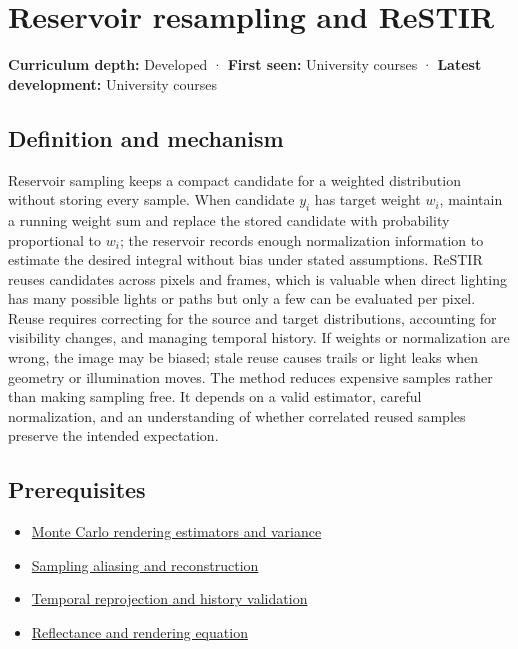 \hypertarget{appendix-68be451b78b1}{}\label{referencestart:appendix-68be451b78b1}
\section{Reservoir resampling and ReSTIR}\label{appendix-68be451b78b1-reservoir-resampling-and-restir}

\textbf{Curriculum depth:} Developed · \textbf{First seen:} University courses · \textbf{Latest development:} University courses

\subsection{Definition and mechanism}\label{appendix-68be451b78b1-definition-and-mechanism}

Reservoir sampling keeps a compact candidate for a weighted distribution without storing every sample. When candidate \(y_i\) has target weight \(w_i\), maintain a running weight sum and replace the stored candidate with probability proportional to \(w_i\); the reservoir records enough normalization information to estimate the desired integral without bias under stated assumptions. ReSTIR reuses candidates across pixels and frames, which is valuable when direct lighting has many possible lights or paths but only a few can be evaluated per pixel. Reuse requires correcting for the source and target distributions, accounting for visibility changes, and managing temporal history. If weights or normalization are wrong, the image may be biased; stale reuse causes trails or light leaks when geometry or illumination moves. The method reduces expensive samples rather than making sampling free. It depends on a valid estimator, careful normalization, and an understanding of whether correlated reused samples preserve the intended expectation.

\subsection{Prerequisites}\label{appendix-68be451b78b1-prerequisites}

\begin{itemize}
\tightlist
\item
  \hyperref[appendix-031e02bf28af]{Monte Carlo rendering estimators and variance}
\item
  \hyperref[appendix-6a7869dd79a6]{Sampling aliasing and reconstruction}
\item
  \hyperref[appendix-0727340a4428]{Temporal reprojection and history validation}
\item
  \hyperref[appendix-96da0b153b77]{Reflectance and rendering equation}
\end{itemize}

